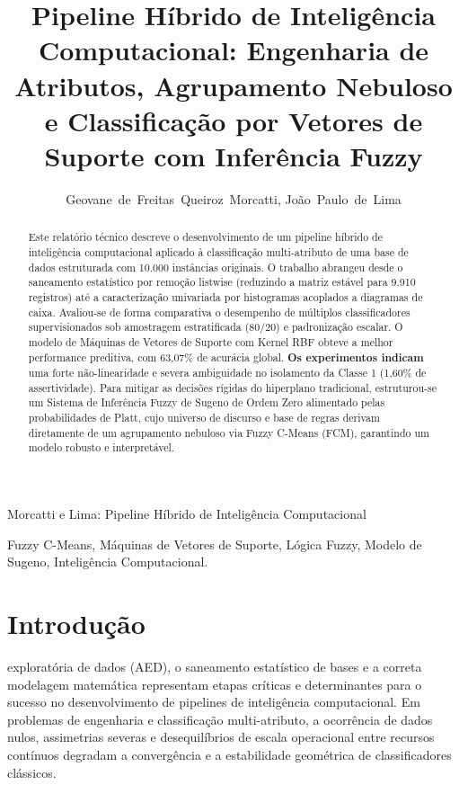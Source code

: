 \documentclass[journal]{IEEEtran}
\begin{document}
\title{Pipeline Híbrido de Inteligência Computacional: Engenharia de Atributos, Agrupamento Nebuloso e Classificação por Vetores de Suporte com Inferência Fuzzy}

\author{Geovane~de~Freitas~Queiroz~Morcatti, João~Paulo~de~Lima}

%
{Morcatti e Lima: Pipeline Híbrido de Inteligência Computacional}

\maketitle

\begin{abstract}
Este relatório técnico descreve o desenvolvimento de um pipeline híbrido de inteligência computacional aplicado à classificação multi-atributo de uma base de dados estruturada com 10.000 instâncias originais. O trabalho abrangeu desde o saneamento estatístico por remoção listwise (reduzindo a matriz estável para 9.910 registros) até a caracterização univariada por histogramas acoplados a diagramas de caixa. Avaliou-se de forma comparativa o desempenho de múltiplos classificadores supervisionados sob amostragem estratificada (80/20) e padronização escalar. O modelo de Máquinas de Vetores de Suporte com Kernel RBF obteve a melhor performance preditiva, com 63,07\% de acurácia global. \textbf{Os experimentos indicam} uma forte não-linearidade e severa ambiguidade no isolamento da Classe 1 (1,60\% de assertividade). Para mitigar as decisões rígidas do hiperplano tradicional, estruturou-se um Sistema de Inferência Fuzzy de Sugeno de Ordem Zero alimentado pelas probabilidades de Platt, cujo universo de discurso e base de regras derivam diretamente de um agrupamento nebuloso via Fuzzy C-Means (FCM), garantindo um modelo robusto e interpretável.
\end{abstract}

\begin{IEEEkeywords}
Fuzzy C-Means, Máquinas de Vetores de Suporte, Lógica Fuzzy, Modelo de Sugeno, Inteligência Computacional.
\end{IEEEkeywords}

\IEEEpeerreviewmaketitle

\section{Introdução}
 exploratória de dados (AED), o saneamento estatístico de bases e a correta modelagem matemática representam etapas críticas e determinantes para o sucesso no desenvolvimento de pipelines de inteligência computacional. Em problemas de engenharia e classificação multi-atributo, a ocorrência de dados nulos, assimetrias severas e desequilíbrios de escala operacional entre recursos contínuos degradam a convergência e a estabilidade geométrica de classificadores clássicos.
\end{document}
